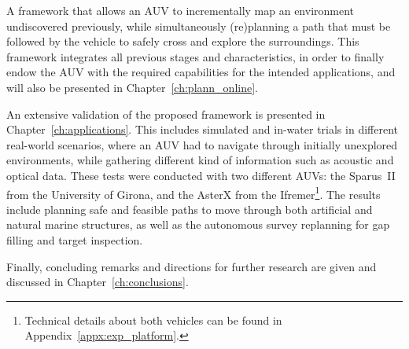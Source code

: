 \begin{inparaenum}[1)]
\item A framework that allows an \ac{AUV} to incrementally map an environment
undiscovered previously, while simultaneously (re)planning a path that must be
followed by the vehicle to safely cross and explore the surroundings. This
framework integrates all previous stages and characteristics, in order to
finally endow the \ac{AUV} with the required capabilities for the intended
applications, and will also be presented in Chapter~\ref{ch:plann_online}.

\item An extensive validation of the proposed framework is presented in
Chapter~\ref{ch:applications}. This includes simulated and in-water trials in
different real-world scenarios, where an \ac{AUV} had to navigate through
initially unexplored environments, while gathering different kind of information
such as acoustic and optical data. These tests were conducted with two different
\acp{AUV}: the Sparus~II from the University of Girona, and the AsterX from the
\ac{Ifremer}\footnote{Technical details about both vehicles can be found in
Appendix~\ref{appx:exp_platform}.}. The results include planning safe and
feasible paths to move through both artificial and natural marine structures, as
well as the autonomous survey replanning for gap filling and target inspection.

\end{inparaenum}

Finally, concluding remarks and directions for further research are given and
discussed in Chapter~\ref{ch:conclusions}.




% 

